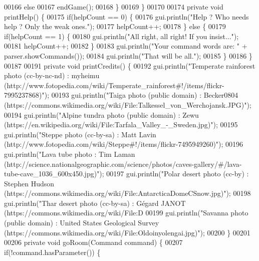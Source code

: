 \begin{DoxyCode}
00166             \textcolor{keywordflow}{else}
00167                 endGame();
00168         \}
00169     \}
00170 
00174     \textcolor{keyword}{private} \textcolor{keywordtype}{void} printHelp() \{
00175         \textcolor{keywordflow}{if}(helpCount == 0) \{
00176             gui.println(\textcolor{stringliteral}{"Help ? Who needs help ? Only the weak ones."});
00177             helpCount++;
00178         \} \textcolor{keywordflow}{else} \{
00179             \textcolor{keywordflow}{if}(helpCount == 1) \{
00180                 gui.println(\textcolor{stringliteral}{"All right, all right! If you insist..."});
00181                 helpCount++;
00182             \}
00183             gui.println(\textcolor{stringliteral}{"Your command words are: "} + parser.showCommands());
00184             gui.println(\textcolor{stringliteral}{"That will be all."});
00185         \}
00186     \}
00187 
00191     \textcolor{keyword}{private} \textcolor{keywordtype}{void} printCredits() \{
00192         gui.println(\textcolor{stringliteral}{"Temperate rainforest photo (cc-by-nc-nd) : myheimu
       (http://www.fotopedia.com/wiki/Temperate\_rainforest#!/items/flickr-7995237868)"});
00193         gui.println(\textcolor{stringliteral}{"Taiga photo (public domain) : Becker0804
       (https://commons.wikimedia.org/wiki/File:Talkessel\_von\_Werchojansk.JPG)"});
00194         gui.println(\textcolor{stringliteral}{"Alpine tundra photo (public domain) : Zewu
       (https://en.wikipedia.org/wiki/File:Tarfala\_Valley\_-\_Sweden.jpg)"});
00195         gui.println(\textcolor{stringliteral}{"Steppe photo (cc-by-sa) : Matt Lavin
       (http://www.fotopedia.com/wiki/Steppe#!/items/flickr-7495949260)"});
00196         gui.println(\textcolor{stringliteral}{"Lava tube photo : Tim Laman
       (http://science.nationalgeographic.com/science/photos/caves-gallery/#/lava-tube-cave\_1036\_600x450.jpg)"});
00197         gui.println(\textcolor{stringliteral}{"Polar desert photo (cc-by) : Stephen Hudson
       (https://commons.wikimedia.org/wiki/File:AntarcticaDomeCSnow.jpg)"});
00198         gui.println(\textcolor{stringliteral}{"Thar desert photo (cc-by-sa) : Gégard JANOT
       (https://commons.wikimedia.org/wiki/File:D%
00199         gui.println(\textcolor{stringliteral}{"Savanna photo (public domain) : United States Geological Survey
       (https://commons.wikimedia.org/wiki/File:Oldoinyolengai.jpg)"});
00200     \}
00201 
00206     \textcolor{keyword}{private} \textcolor{keywordtype}{void} goRoom(Command command) \{
00207         \textcolor{keywordflow}{if}(!command.hasParameter()) \{
}
\end{DoxyCode}
